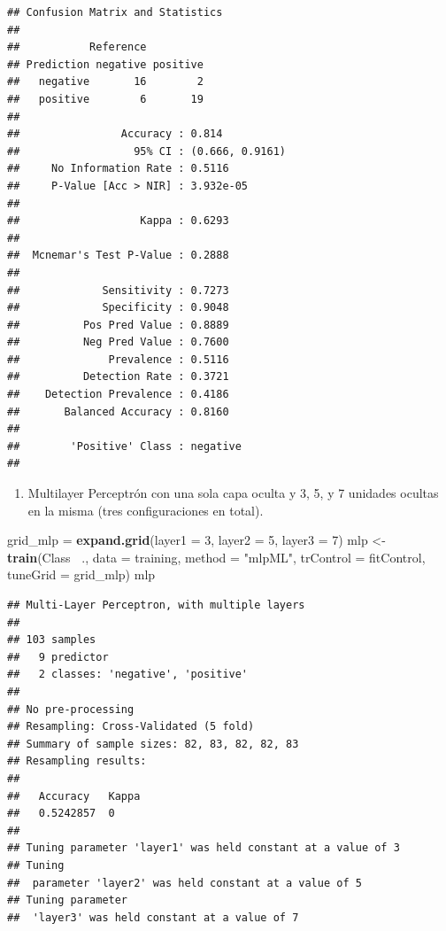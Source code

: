 \documentclass[]{article}
\newenvironment{Shaded}{\begin{snugshade}}{\end{snugshade}}
\newcommand{\DataTypeTok}[1]{\textcolor[rgb]{0.13,0.29,0.53}{#1}}
\newcommand{\DecValTok}[1]{\textcolor[rgb]{0.00,0.00,0.81}{#1}}
\newcommand{\KeywordTok}[1]{\textcolor[rgb]{0.13,0.29,0.53}{\textbf{#1}}}
\newcommand{\NormalTok}[1]{#1}
\newcommand{\OperatorTok}[1]{\textcolor[rgb]{0.81,0.36,0.00}{\textbf{#1}}}
\newcommand{\StringTok}[1]{\textcolor[rgb]{0.31,0.60,0.02}{#1}}
\providecommand{\tightlist}{%
  \setlength{\itemsep}{0pt}\setlength{\parskip}{0pt}}
\begin{document}
\begin{verbatim}
## Confusion Matrix and Statistics
## 
##           Reference
## Prediction negative positive
##   negative       16        2
##   positive        6       19
##                                          
##                Accuracy : 0.814          
##                  95% CI : (0.666, 0.9161)
##     No Information Rate : 0.5116         
##     P-Value [Acc > NIR] : 3.932e-05      
##                                          
##                   Kappa : 0.6293         
##                                          
##  Mcnemar's Test P-Value : 0.2888         
##                                          
##             Sensitivity : 0.7273         
##             Specificity : 0.9048         
##          Pos Pred Value : 0.8889         
##          Neg Pred Value : 0.7600         
##              Prevalence : 0.5116         
##          Detection Rate : 0.3721         
##    Detection Prevalence : 0.4186         
##       Balanced Accuracy : 0.8160         
##                                          
##        'Positive' Class : negative       
## 
\end{verbatim}

\begin{enumerate}
\def\labelenumi{\arabic{enumi}.}
\setcounter{enumi}{2}
\tightlist
\item
  Multilayer Perceptrón con una sola capa oculta y 3, 5, y 7 unidades ocultas en la misma (tres configuraciones en total).
\end{enumerate}

\begin{Shaded}
\begin{Highlighting}[]
\NormalTok{grid_mlp =}\StringTok{ }\KeywordTok{expand.grid}\NormalTok{(}\DataTypeTok{layer1 =} \DecValTok{3}\NormalTok{, }\DataTypeTok{layer2 =} \DecValTok{5}\NormalTok{, }\DataTypeTok{layer3 =} \DecValTok{7}\NormalTok{)}
\NormalTok{mlp <-}\StringTok{ }\KeywordTok{train}\NormalTok{(Class }\OperatorTok{~}\NormalTok{., }\DataTypeTok{data =}\NormalTok{ training,}
             \DataTypeTok{method =} \StringTok{"mlpML"}\NormalTok{,}
             \DataTypeTok{trControl =}\NormalTok{ fitControl,}
             \DataTypeTok{tuneGrid =}\NormalTok{ grid_mlp)}
\NormalTok{mlp}
\end{Highlighting}
\end{Shaded}

\newpage

\begin{verbatim}
## Multi-Layer Perceptron, with multiple layers 
## 
## 103 samples
##   9 predictor
##   2 classes: 'negative', 'positive' 
## 
## No pre-processing
## Resampling: Cross-Validated (5 fold) 
## Summary of sample sizes: 82, 83, 82, 82, 83 
## Resampling results:
## 
##   Accuracy   Kappa
##   0.5242857  0    
## 
## Tuning parameter 'layer1' was held constant at a value of 3
## Tuning
##  parameter 'layer2' was held constant at a value of 5
## Tuning parameter
##  'layer3' was held constant at a value of 7
\end{verbatim}
\end{document}
